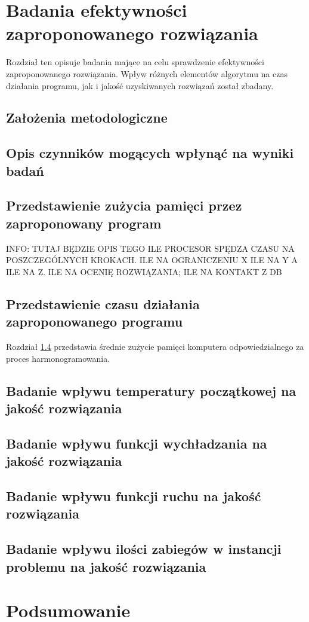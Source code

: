 
\chapter{Badania efektywności zaproponowanego rozwiązania}
Rozdział ten opisuje badania mające na celu sprawdzenie efektywności
zaproponowanego rozwiązania. Wpływ różnych elementów algorytmu na czas działania programu, jak i jakość
uzyskiwanych rozwiązań został zbadany.

\section{Założenia metodologiczne}
\section{Opis czynników mogących wpłynąć na wyniki badań}

\section{Przedstawienie zużycia pamięci przez zaproponowany program}
INFO: TUTAJ BĘDZIE OPIS TEGO ILE PROCESOR SPĘDZA CZASU NA POSZCZEGÓLNYCH KROKACH. ILE
NA OGRANICZENIU X ILE NA Y A ILE NA Z. ILE NA OCENIĘ ROZWIĄZANIA; ILE NA
KONTAKT Z DB

\section{Przedstawienie czasu działania zaproponowanego programu} \label{section:memory-usage}
Rozdział \ref{section:memory-usage} przedstawia średnie zużycie pamięci
komputera odpowiedzialnego za proces harmonogramowania.

\section{Badanie wpływu temperatury początkowej na jakość rozwiązania}
\section{Badanie wpływu funkcji wychładzania na jakość rozwiązania}
\section{Badanie wpływu funkcji ruchu na jakość rozwiązania}
\section{Badanie wpływu ilości zabiegów w instancji problemu na jakość rozwiązania}

\chapter{Podsumowanie}
